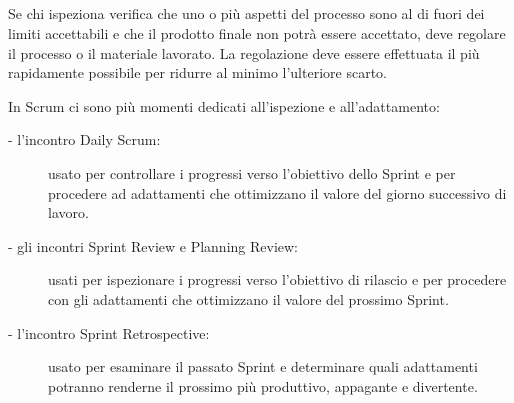 \subsection*{\color{Blue}{LA TERZA  TAPPA \`E  L'ADATTAMENTO}}
Se chi  ispeziona verifica che uno o pi\`u aspetti del processo sono al di fuori dei limiti accettabili 
e che il prodotto finale non potr\`a essere accettato, deve regolare il processo o il
materiale lavorato.  La regolazione  deve essere  effettuata il  pi\`u rapidamente
possibile per ridurre al minimo l'ulteriore scarto.

In Scrum ci sono pi\`u momenti dedicati all'ispezione e all'adattamento:
\begin{description}
\item[- l'incontro Daily  Scrum:]
	usato per controllare i progressi verso l'obiettivo dello Sprint e per procedere ad
	adattamenti  che  ottimizzano il  valore  del giorno  successivo  di lavoro.
\item[- gli incontri Sprint Review e  Planning Review:]
	usati per ispezionare i progressi  verso l'obiettivo di rilascio e per procedere con gli
	adattamenti che ottimizzano il valore del prossimo Sprint.
\item[- l'incontro Sprint Retrospective:]
	usato  per  esaminare il passato Sprint e determinare quali
	adattamenti potranno renderne il prossimo pi\`u produttivo, appagante  e
	divertente.
\end{description}
